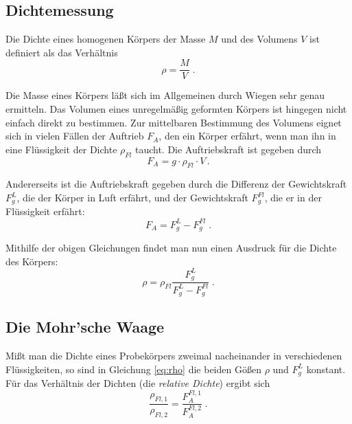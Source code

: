 \subsection{Dichtemessung}

Die Dichte eines homogenen Körpers der Masse $M$ und des Volumens $V$ ist definiert als das Verhältnis
\begin{equation} \label{eq:Dichte}
 \rho = \frac{M}{V} \; .
\end{equation}

Die Masse eines Körpers läßt sich im Allgemeinen durch Wiegen sehr genau ermitteln. Das Volumen eines unregelmäßig geformten Körpers ist hingegen nicht einfach direkt zu bestimmen. Zur mittelbaren Bestimmung des Volumens eignet sich in vielen Fällen der Auftrieb $F_A$, den ein Körper erfährt, wenn man ihn in eine Flüssigkeit der Dichte $\rho_{Fl}$ taucht. Die Auftriebskraft ist gegeben durch
\begin{equation} \label{eq:Auftrieb}
 F_A = g\cdot \rho_{Fl}\cdot V\, .
\end{equation}

Andererseits ist die Auftriebskraft gegeben durch die Differenz der Gewichtskraft $F_g^L$, die der Körper in Luft erfährt, und der Gewichtskraft $F_g^{Fl}$, die er in der Flüssigkeit erfährt:
\begin{equation} \label{eq:Gew-Diff}
 F_A = F_g^L - F_g^{Fl} \; .
\end{equation}

Mithilfe der obigen Gleichungen findet man nun einen Ausdruck für die Dichte des Körpers:
\begin{equation} \label{eq:rho}
 \rho = \rho_{Fl}\frac{F_g^L}{F_g^L - F_g^{Fl}} \; .
\end{equation}

\subsection{Die Mohr'sche Waage}

Mißt man die Dichte eines Probekörpers zweimal nacheinander in verschiedenen Flüssigkeiten, so sind in Gleichung \ref{eq:rho} die beiden Gößen $\rho$ und $F_g^L$ konstant. Für das Verhältnis der Dichten (die \textit{relative Dichte}) ergibt sich
\begin{equation} \label{eq:rel_Dichte}
 \frac{\rho_{Fl,1}}{\rho_{Fl,2}} = \frac{F_A^{Fl,1}}{F_A^{Fl,2}} \; .
\end{equation}

